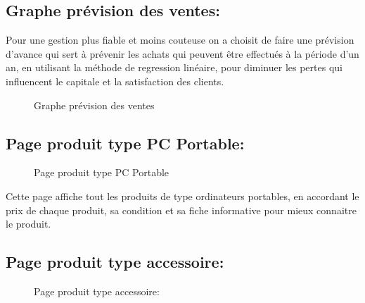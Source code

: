 \documentclass[a4paper]{report}
\begin{document}
\begin{doublespace}
\begin{doublespace}
\begin{doublespace}
\begin{doublespace}
\begin{doublespace}
\begin{doublespace}
                        \subsection{Graphe prévision des ventes:}
                        Pour une gestion plus fiable et moins couteuse on a choisit de faire une prévision d'avance qui sert à prévenir les achats qui peuvent être effectués à la période d'un an, en utilisant la méthode de regression linéaire, pour diminuer les pertes qui influencent le capitale et la satisfaction des clients.
                        \begin{figure}[H]
                            \begin{center}
                                \caption{Graphe prévision des ventes}
                            \end{center}
                        \end{figure}
                        \subsection{Page produit type PC Portable:}
                        \begin{figure}[H]
                            \begin{center}
                                \caption{Page produit type PC Portable}
                            \end{center}
                        \end{figure}
                        Cette page affiche tout les produits de type ordinateurs portables, en accordant le prix de chaque produit, sa condition et sa fiche informative pour mieux connaitre le produit.
                        \subsection{Page produit type accessoire:}
                        \begin{figure}[H]
                            \begin{center}
                                \caption{Page produit type accessoire:}
                            \end{center}
                        \end{figure}


\end{doublespace}
\end{doublespace}
\end{doublespace}
\end{doublespace}
\end{doublespace}
\end{doublespace}
\end{document}
